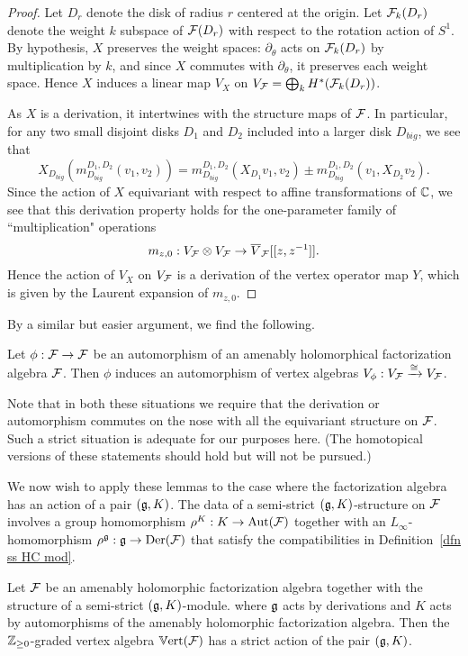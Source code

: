 \begin{proof}
Let $D_r$ denote the disk of radius $r$ centered at the origin. 
Let $\mathcal F_k(D_r)$ denote the weight $k$ subspace of $\mathcal F(D_r)$ with respect to the rotation action of $S^1$. 
By hypothesis, $X$ preserves the weight spaces: $\partial_\theta$ acts on $\mathcal F_k(D_r)$ by multiplication by $k$, 
and since $X$ commutes with $\partial_\theta$, it preserves each weight space. 
Hence $X$ induces a linear map $V_X$ on $V_\mathcal F = \bigoplus_k H^*(\mathcal F_k(D_r))$. 

As $X$ is a derivation, it intertwines with the structure maps of $\mathcal F$. In particular, for any two small disjoint disks $D_1$ and $D_2$ included into a larger disk $D_{big}$, we see that 
\[
X_{D_{big}}(m^{D_1,D_2}_{D_{big}}(v_1, v_2)) = m^{D_1,D_2}_{D_{big}}(X_{D_1} v_1, v_2) \pm m^{D_1,D_2}_{D_{big}}(v_1, X_{D_2} v_2).
\]
Since the action of $X$ equivariant with respect to affine transformations of $\mathbb C$, we see that this derivation property holds for the one-parameter family of ``multiplication" operations 
\[
m_{z,0}: V_\mathcal F \otimes V_\mathcal F \to \overline{V}_\mathcal F[[z,z^{-1}]].
\]
Hence the action of $V_X$ on $V_\mathcal F$ is a derivation of the vertex operator map $Y$, which is given by the Laurent expansion of $m_{z,0}$. 
\end{proof}

By a similar but easier argument, we find the following.

\begin{lemma}
Let $\phi: \mathcal F \to \mathcal F$ be an automorphism of an amenably holomorphical factorization algebra $\mathcal F$. Then $\phi$ induces an automorphism of vertex algebras $V_\phi: V_\mathcal F \xrightarrow{\cong} V_\mathcal F$.
\end{lemma}

Note that in both these situations we require that the derivation or
automorphism commutes on the nose with all the equivariant structure on $\mathcal F$. 
Such a strict situation is adequate for our purposes here. 
(The homotopical versions of these statements should hold but will not be pursued.)

We now wish to apply these lemmas to the case where the factorization algebra has an action of a pair $(\mathfrak g,K)$. 
The data of a semi-strict $(\mathfrak g,K)$-structure on $\mathcal F$ involves a group homomorphism $\rho^K : K \to {\rm Aut}(\mathcal F)$
together with an $L_\infty$-homomorphism $\rho^\mathfrak g : \mathfrak g \to {\rm Der}(\mathcal F)$
that satisfy the compatibilities in Definition~\ref{dfn ss HC mod}. 

\begin{cor}\label{vertpair} 
Let $\mathcal F$ be an amenably holomorphic factorization algebra 
together with the structure of a semi-strict $(\mathfrak g,K)$-module. where
$\mathfrak g$ acts by derivations and $K$ acts by automorphisms of the amenably holomorphic factorization
algebra. 
Then the $\mathbb Z_{\geq 0}$-graded vertex algebra $\mathbb{V}{\rm ert}(\mathcal F)$ has a
strict action of the pair $(\mathfrak g,K)$. 
\end{cor}

